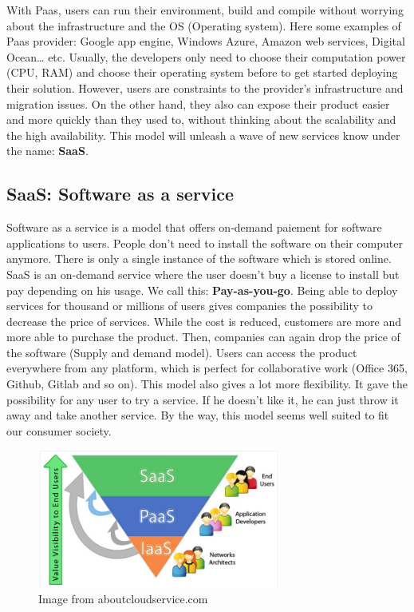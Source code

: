 With Paas, users can run their environment, build and compile without worrying about the infrastructure and the OS (Operating system). Here some examples of Paas provider: Google app engine, Windows Azure, Amazon web services, Digital Ocean… etc.  Usually, the developers only need to choose their computation power (CPU, RAM) and choose their operating system before to get started deploying their solution. However, users are constraints to the provider's infrastructure and migration issues. On the other hand, they also can expose their product easier and more quickly than they used to, without thinking about the scalability and the high availability. This model will unleash a wave of new services know under the name: \textbf{SaaS}.

\subsection{SaaS: Software as a service}

Software as a service is a model that offers on-demand paiement for software applications  to users. People don’t need to install the software on their computer anymore. There is only a single instance of the software which is stored online. SaaS is an on-demand service where the user doesn't buy a license to install but pay depending on his usage. We call this: \textbf{Pay-as-you-go}. Being able to deploy services for thousand or millions of users gives companies the possibility to decrease the price of services. While the cost is reduced, customers are more and more able to purchase the product. Then, companies can again drop the price of the software (Supply and demand model). Users can access the product everywhere from any platform, which is perfect for collaborative work (Office 365, Github, Gitlab and so on). This model also gives a lot more flexibility. It gave the possibility for any user to try a service. If he doesn't like it, he can just throw it away and take another service. By the way, this model seems well suited to fit our consumer society.
\newline

\begin{figure}[H]
  \centering
  \includegraphics[width=8cm]{body/tri.png}
  \caption{Image from aboutcloudservice.com}
\end{figure}

